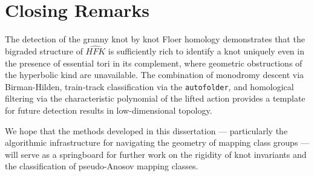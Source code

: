 \section{Closing Remarks}

The detection of the granny knot by knot Floer homology demonstrates that the bigraded structure of $\widehat{HFK}$ is sufficiently rich to identify a knot uniquely even in the presence of essential tori in its complement, where geometric obstructions of the hyperbolic kind are unavailable. The combination of monodromy descent via Birman-Hilden, train-track classification via the \texttt{autofolder}, and homological filtering via the characteristic polynomial of the lifted action provides a template for future detection results in low-dimensional topology.

We hope that the methods developed in this dissertation — particularly the algorithmic infrastructure for navigating the geometry of mapping class groups — will serve as a springboard for further work on the rigidity of knot invariants and the classification of pseudo-Anosov mapping classes.
